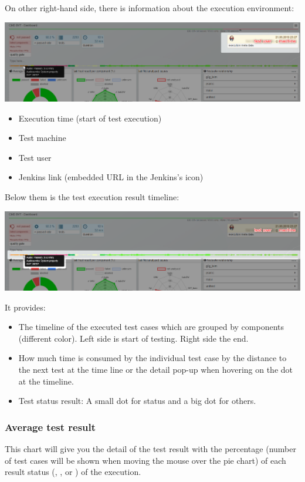 On other right-hand side, there is information about the execution environment:

\includegraphics[width=1\linewidth]{./pictures/dashboard/result_environment.png}
\begin{itemize}
   \item Execution time (start of test execution)
   \item Test machine
   \item Test user
   \item Jenkins link (embedded URL in the Jenkins's icon)
\end{itemize}

Below them is the test execution result timeline:

\includegraphics[width=1\linewidth]{./pictures/dashboard/result_timeline.png}

It provides:
\begin{itemize}
   \item The timeline of the executed test cases which are grouped by components 
         (different color). Left side is start of testing. Right side the end.
   \item How much time is consumed by the individual test case by the distance 
         to the next test at the time line or the detail pop-up when hovering on the 
         dot at the timeline.
   \item Test status result: A small dot for  status and a big dot 
         for others.
\end{itemize}


\subsubsection{Average test result} 
This chart will give you the detail of the test 
result with the percentage (number of test cases will be shown when moving the mouse 
over the pie chart) of each result status (, , 
 or ) of the execution. 

